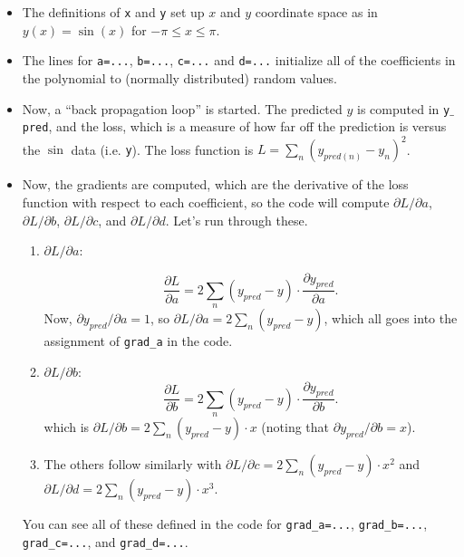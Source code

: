 \documentclass[12pt]{article}
\begin{document}
\begin{itemize}
\item The definitions of {\tt x} and {\tt y} set up $x$ and $y$ coordinate space as in $y(x)=\sin(x)$ for $-\pi\le x\le \pi$.

\item The lines for {\tt a=...}, {\tt b=...},  {\tt c=...} and {\tt d=...} initialize all of the coefficients in the polynomial to (normally distributed) random values.

\item Now, a ``back propagation loop'' is started.  The predicted $y$ is computed in {\tt y$\_$pred}, and the loss, which is a measure of how far off the prediction is versus the $\sin$ data (i.e. {\tt y}). The loss function is $L=\sum_n (y_{pred(n)}-y_n)^2$.

\item Now, the gradients are computed, which are the derivative of the loss function with respect to each coefficient, so the code will compute ${\partial L}/{\partial a}$, ${\partial L}/{\partial b}$, ${\partial L}/{\partial c}$, and ${\partial L}/{\partial d}$. Let's run through these.

\begin{enumerate}
\item ${\partial L}/{\partial a}$:

\begin{equation}
\frac{\partial L}{\partial a}=2 \sum_n (y_{pred}-y)\cdot \frac{\partial y_{pred}}{\partial a}.
\end{equation}
Now, ${\partial y_{pred}}/{\partial a}=1$, so ${\partial L}/{\partial a}=2\sum_n  (y_{pred}-y)$, which all goes into the assignment of \verb|grad_a| in the code.

\item ${\partial L}/{\partial b}$:
\begin{equation}
\frac{\partial L}{\partial b}=2 \sum_n (y_{pred}-y)\cdot \frac{\partial y_{pred}}{\partial b}.
\end{equation}
which is ${\partial L}/{\partial b}=2\sum_n  (y_{pred}-y)\cdot x$ (noting that ${\partial y_{pred}}/{\partial b}=x$).

\item The others follow similarly with  ${\partial L}/{\partial c}=2\sum_n  (y_{pred}-y)\cdot x^2$ and  ${\partial L}/{\partial d}=2\sum_n  (y_{pred}-y)\cdot x^3$.

\end{enumerate}
You can see all of these defined in the code for \verb|grad_a=...|, \verb|grad_b=...|, \verb|grad_c=...|, and \verb|grad_d=...|.


\end{itemize}
\end{document}
